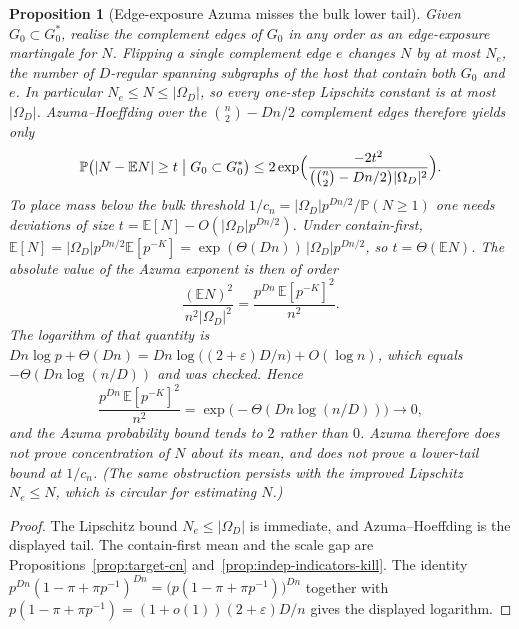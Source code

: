\documentclass[11pt]{article}
\newtheorem{proposition}[theorem]{Proposition}
\newcommand{\EE}{\mathbb{E}}
\newcommand{\PP}{\mathbb{P}}
\begin{document}
\begin{proposition}[Edge-exposure Azuma misses the bulk lower tail]
\label{prop:azuma-miss}
Given \(G_0\subset G^*_0\), realise the complement edges of \(G_0\) in any order
as an edge-exposure martingale for \(N\).
Flipping a single complement edge \(e\) changes \(N\) by at most
\(N_e\), the number of \(D\)-regular spanning subgraphs of the host that contain
both \(G_0\) and \(e\).
In particular \(N_e\le N\le\lvert\Omega_D\rvert\), so every one-step Lipschitz
constant is at most \(\lvert\Omega_D\rvert\).
Azuma--Hoeffding over the \(\binom{n}{2}-Dn/2\) complement edges therefore yields
only
\[
\PP\bigl(\lvert N-\EE N\rvert\ge t\bigm|G_0\subset G^*_0\bigr)
\le
2\exp\Bigl(\frac{-2t^2}{\bigl(\binom{n}{2}-Dn/2\bigr)\lvert\Omega_D\rvert^2}\Bigr).
\]
To place mass below the bulk threshold \(1/c_n=\lvert\Omega_D\rvert p^{Dn/2}/\PP(N\ge 1)\)
one needs deviations of size
\(t=\EE[N]-O(\lvert\Omega_D\rvert p^{Dn/2})\).
Under contain-first,
\(\EE[N]=\lvert\Omega_D\rvert p^{Dn/2}\EE[p^{-K}]=\exp(\Theta(Dn))\,\lvert\Omega_D\rvert p^{Dn/2}\),
so \(t=\Theta(\EE N)\).
The absolute value of the Azuma exponent is then of order
\[
\frac{(\EE N)^2}{n^2\lvert\Omega_D\rvert^2}
=
\frac{p^{Dn}\,\EE[p^{-K}]^2}{n^2}.
\]
The logarithm of that quantity is \(Dn\log p+\Theta(Dn)=Dn\log\bigl((2+\varepsilon)D/n\bigr)+O(\log n)\),
which equals \(-\Theta(Dn\log(n/D))\) and was checked.
Hence
\[
\frac{p^{Dn}\,\EE[p^{-K}]^2}{n^2}
=
\exp\bigl(-\Theta(Dn\log(n/D))\bigr)
\to 0,
\]
and the Azuma probability bound tends to \(2\) rather than \(0\).
Azuma therefore does not prove concentration of \(N\) about its mean, and does
not prove a lower-tail bound at \(1/c_n\).
(The same obstruction persists with the improved Lipschitz \(N_e\le N\), which is
circular for estimating \(N\).)
\end{proposition}

\begin{proof}
The Lipschitz bound \(N_e\le\lvert\Omega_D\rvert\) is immediate, and Azuma--Hoeffding
is the displayed tail.
The contain-first mean and the scale gap are
Propositions~\ref{prop:target-cn} and~\ref{prop:indep-indicators-kill}.
The identity
\(p^{Dn}(1-\pi+\pi p^{-1})^{Dn}= \bigl(p(1-\pi+\pi p^{-1})\bigr)^{Dn}\)
together with
\(p(1-\pi+\pi p^{-1})=(1+o(1))(2+\varepsilon)D/n\)
gives the displayed logarithm.
\end{proof}
\end{document}
